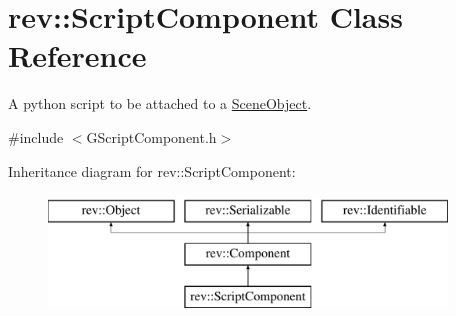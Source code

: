 \hypertarget{classrev_1_1_script_component}{}\section{rev\+::Script\+Component Class Reference}
\label{classrev_1_1_script_component}


A python script to be attached to a \mbox{\hyperlink{classrev_1_1_scene_object}{Scene\+Object}}.  




{\ttfamily \#include $<$G\+Script\+Component.\+h$>$}

Inheritance diagram for rev\+::Script\+Component\+:\begin{figure}[H]
\begin{center}
\leavevmode
\includegraphics[height=3.000000cm]{classrev_1_1_script_component}
\end{center}
\end{figure}
